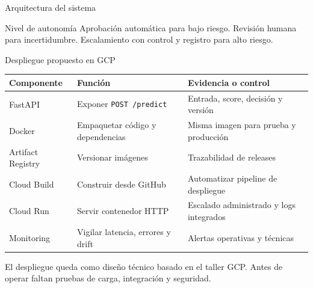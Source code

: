 \documentclass[aspectratio=169,10pt]{beamer}
\begin{document}
\begin{frame}{Arquitectura del sistema}\small
\begin{center}
\end{center}
\begin{block}{Nivel de autonomía}
Aprobación automática para bajo riesgo. Revisión humana para incertidumbre. Escalamiento con control y registro para alto riesgo.
\end{block}
\end{frame}

\begin{frame}{Despliegue propuesto en GCP}\small
\begin{tabularx}{\linewidth}{@{}p{.24\linewidth}X X@{}}\toprule
Componente & Función & Evidencia o control\\\midrule
FastAPI & Exponer \texttt{POST /predict} & Entrada, score, decisión y versión\\
Docker & Empaquetar código y dependencias & Misma imagen para prueba y producción\\
Artifact Registry & Versionar imágenes & Trazabilidad de releases\\
Cloud Build & Construir desde GitHub & Automatizar pipeline de despliegue\\
Cloud Run & Servir contenedor HTTP & Escalado administrado y logs integrados\\
Monitoring & Vigilar latencia, errores y drift & Alertas operativas y técnicas\\\bottomrule
\end{tabularx}
\vfill
\footnotesize El despliegue queda como diseño técnico basado en el taller GCP. Antes de operar faltan pruebas de carga, integración y seguridad.
\end{frame}
\end{document}

